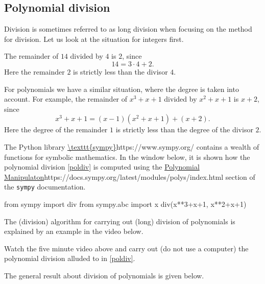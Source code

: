 \documentclass{article}
\begin{document}
\subsection{Polynomial division}

Division is sometimes referred to as long division when
focusing on the method for division. Let us look
at the situation for integers first.

The remainder of 
$14$ divided by $4$ is $2$, since
$$
14 = 3\cdot 4 + 2.
$$
Here the remainder $2$ is strictly less than the divisor $4$.

For polynomials we have a similar situation, where the degree
is taken into account. For example, the remainder of
$x^3 + x + 1$ divided by $x^2 + x + 1$ is $x+2$, since
\begin{equation}\label{poldiv}
x^3 + x + 1 = (x-1)(x^2 + x + 1) + (x+2).
\end{equation}
Here the degree of the remainder $1$ is strictly less 
than the degree of the divisor $2$.

The Python library \url{\texttt{sympy}}{https://www.sympy.org/} contains a
wealth of functions for symbolic mathematics. In the window
below, it is shown how the polynomial division \eqref{poldiv}
is computed using the
\url{Polynomial Manipulaton}{https://docs.sympy.org/latest/modules/polys/index.html} section
of the \texttt{sympy} documentation.

\begin{sage}
from sympy import div
from sympy.abc import x
div(x**3+x+1, x**2+x+1)
\end{sage}

The (division) algorithm for carrying out (long) division of
polynomials is explained by an example in the video below.

\begin{video}
\end{video}


\beginshex
Watch the five minute video above and
carry out (do not use a computer) the polynomial division alluded to in \eqref{poldiv}.
\endshex

The general result about division of polynomials is given below.
\end{document}
